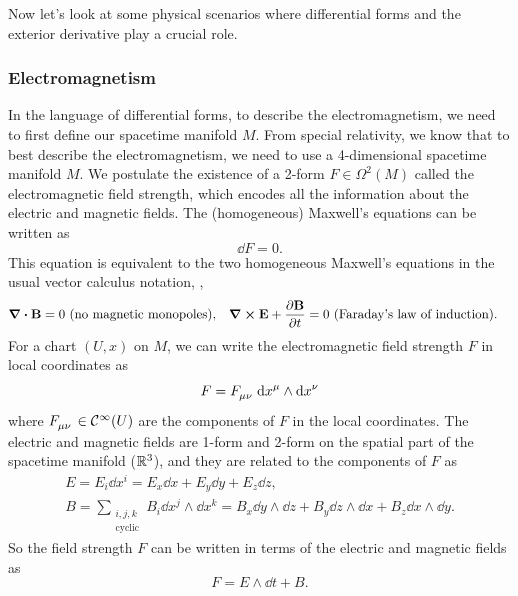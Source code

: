 Now let's look at some physical scenarios where differential forms and the exterior derivative play a crucial role.

\subsubsection{Electromagnetism}

In the language of differential forms, to describe the electromagnetism, we need to first define our spacetime manifold \(M\). From special relativity, we know that to best describe the electromagnetism, we need to use a 4-dimensional spacetime manifold \(M\). We postulate the existence of a 2-form \(F \in \Omega^2(M)\) called the electromagnetic field strength, which encodes all the information about the electric and magnetic fields. The (homogeneous) Maxwell's equations can be written as
\begin{equation*}
    \dd F = 0.
\end{equation*}
This equation is equivalent to the two homogeneous Maxwell's equations in the usual vector calculus notation, \ie,
\begin{align*}
    \div{\vb{B}}                    & = 0 \text{ (no magnetic monopoles)},      &
    \curl{\vb{E}} + \pdv{\vb{B}}{t} & = 0 \text{ (Faraday's law of induction)}.
\end{align*}
For a chart \((U, x)\) on \(M\), we can write the electromagnetic field strength \(F\) in local coordinates as
\begin{equation*}
    F = \tensor{F}{_{\mu}_{\nu}} \dd{x^\mu} \wedge \dd{x^\nu}
\end{equation*}
where \(\tensor{F}{_{\mu}_{\nu}} \in \SC^\infty(U)\) are the components of \(F\) in the local coordinates. The electric and magnetic fields are 1-form and 2-form on the spatial part of the spacetime manifold (\(\mathbb R^3\)), and they are related to the components of \(F\) as
\begin{gather*}
    E= E_i \dd x^i = E_x \dd{x} + E_y \dd{y} + E_z \dd{z},                                                                                         \\
    B = \sum_{\substack{i, j, k \\ \text{cyclic}}} B_i \dd{x^j} \wedge \dd{x^k} = B_x \dd{y} \wedge \dd{z} + B_y \dd{z} \wedge \dd{x} + B_z \dd{x} \wedge \dd{y}.
\end{gather*}
So the field strength \(F\) can be written in terms of the electric and magnetic fields as
\begin{equation*}
    F = E \wedge \dd{t} + B.
\end{equation*}
